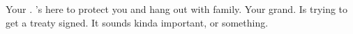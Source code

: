 \documentclass[char]{NeptuneBall}
\begin{document}
%
%
%

\begin{contacts}
  \contact{\cAriel{}} Your \cAriel{\parent}. \cAriel{\They}'s here to protect you and hang out with \cAriel{\their} family.
	\contact{\cKing{}} Your grand\cKing{\parent}. Is trying to get a treaty signed. It sounds kinda important, or something.
\end{contacts}
\end{document}
